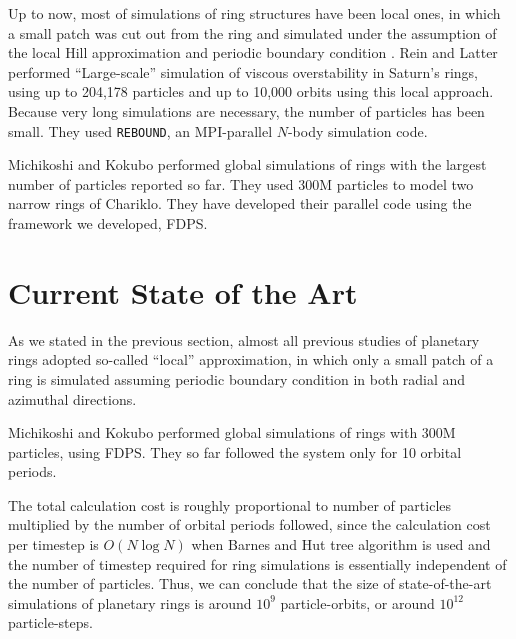 \documentclass[conference]{IEEEtran}
\begin{document}
Up to now, most of simulations of ring structures have been local
ones, in which a small patch  was cut out from the ring and simulated
under the assumption of the local Hill approximation and periodic
boundary condition \cite{WisdomTremaine1988}. Rein and Latter\cite{ReinLatter2013} performed ``Large-scale'' simulation of viscous
overstability in Saturn's rings, using up to 204,178 particles and up
to 10,000 orbits using this local approach.  Because very long
simulations are necessary, the number of particles has been
small. They used {\tt REBOUND}\cite{ReinLiu2012}, an MPI-parallel
$N$-body simulation code.


Michikoshi and Kokubo\cite{MichikoshiKokubo2017} performed global simulations of rings with
the largest number of particles reported so far. They used 300M particles to
model two narrow rings of Chariklo. They have developed their parallel
code using the framework we developed, FDPS\cite{Iwasawaetal2016}. 

\section{Current State of the Art}




As we stated in the previous section, almost all previous studies of
planetary rings adopted so-called ``local'' approximation, in which
only a small patch of a ring is simulated assuming periodic boundary
condition in both radial and azimuthal directions. 

Michikoshi and Kokubo\cite{MichikoshiKokubo2017} performed global
simulations of rings with 300M particles, using
FDPS\cite{Iwasawaetal2016}. They so far followed the system only for
10 orbital periods.

The total calculation cost is roughly proportional to number of
particles multiplied by the number of orbital periods followed, since
the calculation cost per timestep is $O(N \log N)$ when Barnes and Hut
tree algorithm is used and the number of timestep required for ring
simulations is essentially independent of the number of
particles. Thus, we can conclude that the size of state-of-the-art
simulations of planetary rings is around $10^9$ particle-orbits, or
around $10^{12}$ particle-steps.
\end{document}
